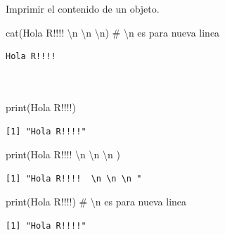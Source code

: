 \documentclass[
  ignorenonframetext,
  aspectratio=169,
  spanish,
]{beamer}
\newenvironment{Shaded}{\begin{snugshade}}{\end{snugshade}}
\newcommand{\CommentTok}[1]{\textcolor[rgb]{0.37,0.37,0.37}{#1}}
\newcommand{\FunctionTok}[1]{\textcolor[rgb]{0.28,0.35,0.67}{#1}}
\newcommand{\NormalTok}[1]{\textcolor[rgb]{0.00,0.23,0.31}{#1}}
\newcommand{\SpecialCharTok}[1]{\textcolor[rgb]{0.37,0.37,0.37}{#1}}
\newcommand{\StringTok}[1]{\textcolor[rgb]{0.13,0.47,0.30}{#1}}
\begin{document}
\begin{frame}[fragile]{Imprimir el contenido de un objeto.}
\label{imprimir-el-contenido-de-un-objeto.-1}
\begin{Shaded}
\begin{Highlighting}[]
\FunctionTok{cat}\NormalTok{(}\StringTok{\textquotesingle{}Hola R!!!! }\SpecialCharTok{\textbackslash{}n}\StringTok{ }\SpecialCharTok{\textbackslash{}n}\StringTok{ }\SpecialCharTok{\textbackslash{}n}\StringTok{\textquotesingle{}}\NormalTok{) }\CommentTok{\# \textbackslash{}n es para nueva linea}
\end{Highlighting}
\end{Shaded}

\begin{verbatim}
Hola R!!!! 
 
 
\end{verbatim}

\begin{Shaded}
\begin{Highlighting}[]
\FunctionTok{print}\NormalTok{(}\StringTok{\textquotesingle{}Hola R!!!!\textquotesingle{}}\NormalTok{)}
\end{Highlighting}
\end{Shaded}

\begin{verbatim}
[1] "Hola R!!!!"
\end{verbatim}

\begin{Shaded}
\begin{Highlighting}[]
\FunctionTok{print}\NormalTok{(}\StringTok{\textquotesingle{}Hola R!!!!  }\SpecialCharTok{\textbackslash{}n}\StringTok{ }\SpecialCharTok{\textbackslash{}n}\StringTok{ }\SpecialCharTok{\textbackslash{}n}\StringTok{ \textquotesingle{}}\NormalTok{)}
\end{Highlighting}
\end{Shaded}

\begin{verbatim}
[1] "Hola R!!!!  \n \n \n "
\end{verbatim}

\begin{Shaded}
\begin{Highlighting}[]
\FunctionTok{print}\NormalTok{(}\StringTok{\textquotesingle{}Hola R!!!!\textquotesingle{}}\NormalTok{) }\CommentTok{\# \textbackslash{}n es para nueva linea}
\end{Highlighting}
\end{Shaded}

\begin{verbatim}
[1] "Hola R!!!!"
\end{verbatim}
\end{frame}
\end{document}
